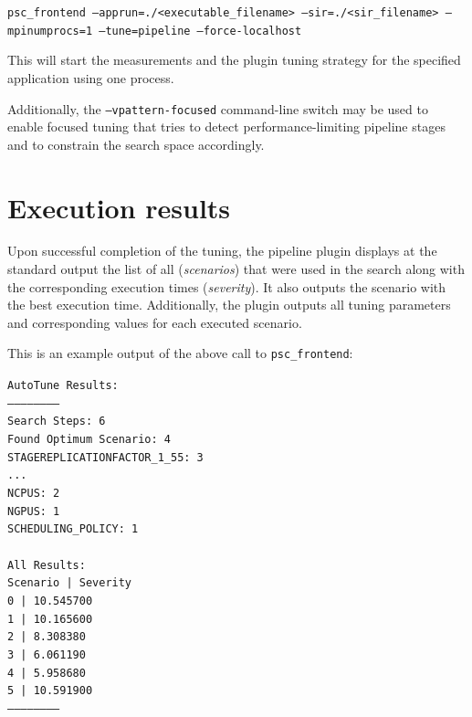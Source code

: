 \documentclass[11pt,a4paper, oneside]{book} %
\newenvironment{code}%
{
\addtolength{\leftskip}{0.5cm}}%
{

}
\begin{document}
\texttt{psc\_frontend --apprun=./<executable\_filename> --sir=./<sir\_filename> --mpinumprocs=1 --tune=pipeline --force-localhost }

\vspace*{0.5cm}
This will start the measurements and the plugin tuning strategy for the specified application using one process.

Additionally, the \texttt{--vpattern-focused} command-line switch may be used to enable focused tuning that tries to detect performance-limiting pipeline stages and to constrain the search space accordingly.

\section{Execution results}
Upon successful completion of the tuning, the pipeline plugin displays at the standard output the list of all (\textit{scenarios}) that were used in the search along with the corresponding execution times (\textit{severity}). It also outputs the scenario with the best execution time. Additionally, the plugin outputs all tuning parameters and corresponding values for each executed scenario.

This is an example output of the above call to \texttt{psc\_frontend}:

\begin{code}
\texttt{AutoTune Results:\\
------------------------\\
Search Steps: 6 \\
Found Optimum Scenario: 4\\
\phantom{}\hspace{1em}STAGEREPLICATIONFACTOR\_1\_55: 3\\
\phantom{}\hspace{1em}...\\
\phantom{}\hspace{1em}NCPUS: 2\\
\phantom{}\hspace{1em}NGPUS: 1\\
\phantom{}\hspace{1em}SCHEDULING\_POLICY: 1\\
\\
All Results:\\
Scenario	|  Severity\\
0		|  10.545700\\
1		|  10.165600\\
2		|  8.308380\\
3		|  6.061190\\
4		|  5.958680\\
5		|  10.591900\\
------------------------}
\end{code}
\end{document}
